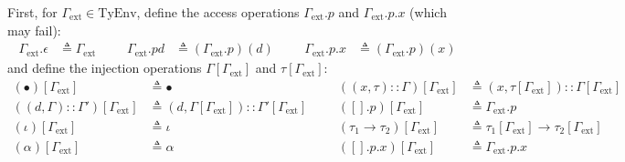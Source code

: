 \documentclass{article}
\theoremstyle{definition}
\newcommand*{\cons}{::}
\newcommand*{\modid}{d}
\newcommand*{\TyEnv}{\text{TyEnv}}
\newcommand*{\external}{\Gamma_{\text{ext}}}
\begin{document}
First, for $\external\in\TyEnv$, define the access operations $\external.p$ and $\external.p.x$ (which may fail):
\begin{align*}
	\external.\epsilon & \triangleq\external &  &  & \external.p\modid & \triangleq(\external.p)(\modid) &  &  & \external.p.x & \triangleq(\external.p)(x)
\end{align*}
and define the injection operations $\Gamma[\external]$ and $\tau[\external]$:
\begin{align*}
	(\bullet)[\external]                     & \triangleq\bullet                                           &  &  & ((x,\tau)\cons\Gamma)[\external]     & \triangleq(x,\tau[\external])\cons\Gamma[\external]     \\
	((\modid,\Gamma)\cons\Gamma')[\external] & \triangleq(\modid,\Gamma[\external])\cons\Gamma'[\external] &  &  & ([].p)[\external]                    & \triangleq\external.p                                   \\
	(\iota)[\external]                       & \triangleq\iota                                             &  &  & (\tau_1\rightarrow\tau_2)[\external] & \triangleq\tau_1[\external]\rightarrow\tau_2[\external] \\
	(\alpha)[\external]                      & \triangleq\alpha                                            &  &  & ([].p.x)[\external]                  & \triangleq\external.p.x
\end{align*}
\end{document}
